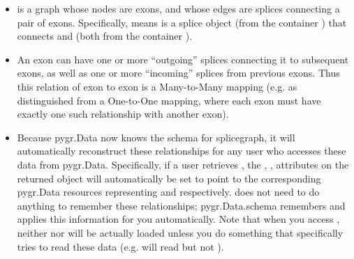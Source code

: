 \documentclass{howto}
\begin{document}
\begin{itemize}
\item {} is a graph whose nodes are exons, and whose
edges are splices connecting a pair of exons.  Specifically,
 means  is a 
splice object (from the container ) that connects
 and  (both from the container ).

\item An exon can have one or more ``outgoing'' splices connecting it
to subsequent exons, as well as one or more ``incoming'' splices from
previous exons.  Thus this relation of exon to exon is a Many-to-Many
mapping (e.g. as distinguished from a One-to-One mapping, where each
exon must have exactly one such relationship with another exon).

\item Because pygr.Data now knows the schema for splicegraph, it
will automatically reconstruct these relationships for any user who
accesses these data from pygr.Data.  Specifically, if a user
retrieves ,
the , ,  attributes on
the returned object will automatically be set to point to the 
corresponding pygr.Data resources representing  and 
respectively.   does not need to do anything to 
remember these relationships; pygr.Data.schema remembers and applies
this information for you automatically.  Note that when you access
, neither  nor  will be 
actually loaded unless you do something that specifically tries to
read these data (e.g.  will read
 but not ).


\end{itemize}
\end{document}
